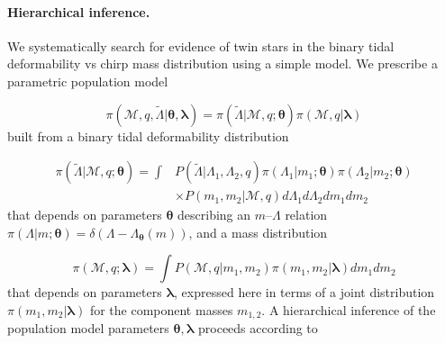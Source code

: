 \documentclass[aps,prl,twocolumn,superscriptaddress,footinbib]{revtex4-1}
\begin{document}
\paragraph{Hierarchical inference.}\label{Sec_inference}

We systematically search for evidence of twin stars in the binary tidal deformability vs chirp mass distribution using a simple model. We prescribe a parametric population model

\begin{equation}
    \pi(\mathcal{M},q,\tilde{\Lambda}|\boldsymbol{\theta},\boldsymbol{\lambda}) = \pi(\tilde{\Lambda}|\mathcal{M},q;\boldsymbol{\theta}) \pi(\mathcal{M},q|\boldsymbol{\lambda})
\end{equation}
built from a binary tidal deformability distribution

\begin{align} \label{lambdadist}
    \pi(\tilde{\Lambda}|\mathcal{M},q;\boldsymbol{\theta}) = \int& P(\tilde{\Lambda}|\Lambda_1,\Lambda_2,q) \pi(\Lambda_1|m_1;\boldsymbol{\theta}) \pi(\Lambda_2|m_2;\boldsymbol{\theta}) \nonumber \\ 
    &\times P(m_1,m_2|\mathcal{M},q) d\Lambda_1 d\Lambda_2 dm_1 dm_2 
\end{align}
that depends on parameters $\boldsymbol{\theta}$ describing an $m$--$\Lambda$ relation $\pi(\Lambda|m;\boldsymbol{\theta}) = \delta(\Lambda - \Lambda_{\boldsymbol{\theta}}(m))$, and a mass distribution

\begin{equation}
    \pi(\mathcal{M},q;\boldsymbol{\lambda}) = \int P(\mathcal{M},q|m_1,m_2) \pi(m_1,m_2|\boldsymbol{\lambda}) dm_1 dm_2
\end{equation}
that depends on parameters $\boldsymbol{\lambda}$, expressed here in terms of a joint distribution $\pi(m_1,m_2|\boldsymbol{\lambda})$ for the component masses $m_{1,2}$. A hierarchical inference of the population model parameters $\boldsymbol{\theta}, \boldsymbol{\lambda}$ proceeds according to~\cite{MandelFarr2019}
\end{document}

